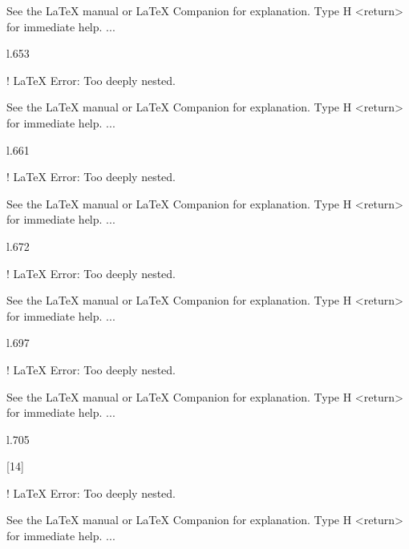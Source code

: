 {{{{{{{{{{{{{{{{{{\begin{itemize}
\begin{itemize}
\begin{itemize}
\begin{itemize}
\begin{itemize}
\begin{itemize}
See the LaTeX manual or LaTeX Companion for explanation.
Type  H <return>  for immediate help.
 ...                                              
                                                  
l.653                     \begin{itemize}
                                         

! LaTeX Error: Too deeply nested.

See the LaTeX manual or LaTeX Companion for explanation.
Type  H <return>  for immediate help.
 ...                                              
                                                  
l.661                     \begin{itemize}
                                         

! LaTeX Error: Too deeply nested.

See the LaTeX manual or LaTeX Companion for explanation.
Type  H <return>  for immediate help.
 ...                                              
                                                  
l.672                     \begin{itemize}
                                         

! LaTeX Error: Too deeply nested.

See the LaTeX manual or LaTeX Companion for explanation.
Type  H <return>  for immediate help.
 ...                                              
                                                  
l.697                     \begin{itemize}
                                         

! LaTeX Error: Too deeply nested.

See the LaTeX manual or LaTeX Companion for explanation.
Type  H <return>  for immediate help.
 ...                                              
                                                  
l.705                     \begin{itemize}
                                         
[14]

! LaTeX Error: Too deeply nested.

See the LaTeX manual or LaTeX Companion for explanation.
Type  H <return>  for immediate help.
 ...                                              
                                                  

\end{itemize}
\end{itemize}
\end{itemize}
\end{itemize}
\end{itemize}
\end{itemize}
\end{itemize}
\end{itemize}
\end{itemize}
\end{itemize}
\end{itemize}}}}}}}}}}}}}}}}}}}
